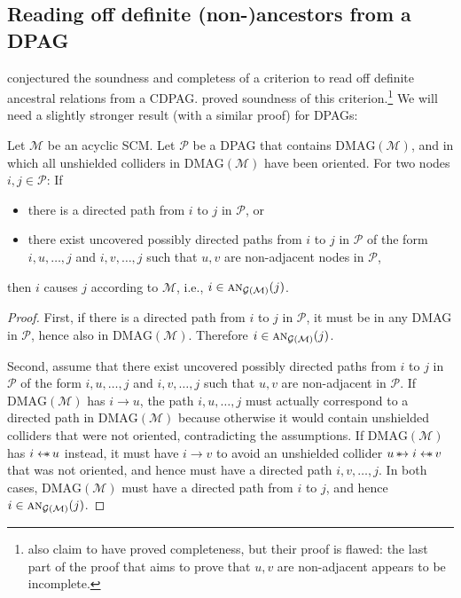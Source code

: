 \documentclass[twoside,11pt]{article}
\newcommand\C[1]{\mathcal{#1}}
\newcommand\mathbfsc[1]{\text{\normalfont\scshape#1}}
\newcommand\ansub[2]{\mathbfsc{an}_{#1}(#2)}
\newcommand{\ots}{\leftarrow\mkern-13mu\ast\,}
\newcommand{\sto}{\,\ast\mkern-13mu\to}
\newcommand{\DMAG}{\mathrm{DMAG}}
\begin{document}
\subsection{Reading off definite (non-)ancestors from a DPAG}\label{sec:app:dpag_ancestors}

\citet{Zhang2006} conjectured the soundness and completess of a criterion to read off definite ancestral relations from a CDPAG.
\citet{Roumpelaki++_UAIWS_16} proved soundness of this criterion.\footnote{\citet{Roumpelaki++_UAIWS_16} also claim to have proved completeness, but their proof is flawed: the last part of the proof that aims to prove that $u,v$ are non-adjacent appears to be incomplete.}
We will need a slightly stronger result (with a similar proof) for DPAGs:
\begin{proposition}\label{prop:dpag_ancestors}
  Let $\C{M}$ be an acyclic SCM. Let $\C{P}$ be a DPAG that contains $\DMAG(\C{M})$, and in which all unshielded colliders in $\DMAG(\C{M})$ have been oriented. For two nodes $i,j \in \C{P}$: If 
  \begin{itemize}
    \item there is a directed path from $i$ to $j$ in $\C{P}$, or 
    \item there exist uncovered possibly directed paths from $i$ to $j$ in $\C{P}$ of the form $i,u,\dots,j$ and $i,v,\dots,j$ such that $u,v$ are non-adjacent nodes in $\C{P}$, 
  \end{itemize}
  then $i$ causes $j$ according to $\C{M}$, i.e., $i \in \ansub{\C{G}(\C{M})}{j}$.
\end{proposition}
\begin{proof}
  First, if there is a directed path from $i$ to $j$ in $\C{P}$, it must be in any DMAG in $\C{P}$, hence also in $\DMAG(\C{M})$. 
  Therefore $i \in \ansub{\C{G}(\C{M})}{j}$. 

  Second, assume that there exist uncovered possibly directed paths from $i$ to $j$ in $\C{P}$ of the form $i,u,\dots,j$ and $i,v,\dots,j$ such that $u,v$ are non-adjacent in $\C{P}$. 
  If $\DMAG(\C{M})$ has $i \to u$, the path $i,u,\dots,j$ must actually correspond to a directed path in $\DMAG(\C{M})$ because otherwise it would contain unshielded colliders that were not oriented, contradicting the assumptions. 
  If $\DMAG(\C{M})$ has $i \ots u$ instead, it must have $i \to v$ to avoid an unshielded collider $u \sto i \ots v$ that was not oriented, and hence must have a directed path $i,v,\dots,j$. 
  In both cases, $\DMAG(\C{M})$ must have a directed path from $i$ to $j$, and hence $i \in \ansub{\C{G}(\C{M})}{j}$.
\end{proof}
\end{document}
